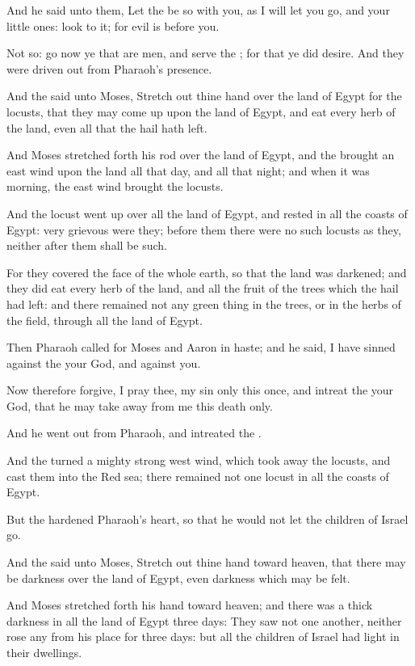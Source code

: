 \verse And he said unto them, Let the \LORD be so with you, as I will let you go, and your little ones: look to it; for evil is before you.

\verse Not so: go now ye that are men, and serve the \LORD; for that ye did desire. And they were driven out from Pharaoh's presence.

\verse And the \LORD said unto Moses, Stretch out thine hand over the land of Egypt for the locusts, that they may come up upon the land of Egypt, and eat every herb of the land, even all that the hail hath left.

\verse And Moses stretched forth his rod over the land of Egypt, and the \LORD brought an east wind upon the land all that day, and all that night; and when it was morning, the east wind brought the locusts.

\verse And the locust went up over all the land of Egypt, and rested in all the coasts of Egypt: very grievous were they; before them there were no such locusts as they, neither after them shall be such.

\verse For they covered the face of the whole earth, so that the land was darkened; and they did eat every herb of the land, and all the fruit of the trees which the hail had left: and there remained not any green thing in the trees, or in the herbs of the field, through all the land of Egypt.

\verse Then Pharaoh called for Moses and Aaron in haste; and he said, I have sinned against the \LORD your God, and against you.

\verse Now therefore forgive, I pray thee, my sin only this once, and intreat the \LORD your God, that he may take away from me this death only.

\verse And he went out from Pharaoh, and intreated the \LORD.

\verse And the \LORD turned a mighty strong west wind, which took away the locusts, and cast them into the Red sea; there remained not one locust in all the coasts of Egypt.

\verse But the \LORD hardened Pharaoh's heart, so that he would not let the children of Israel go.

\verse And the \LORD said unto Moses, Stretch out thine hand toward heaven, that there may be darkness over the land of Egypt, even darkness which may be felt.

\verse And Moses stretched forth his hand toward heaven; and there was a thick darkness in all the land of Egypt three days: \verse They saw not one another, neither rose any from his place for three days: but all the children of Israel had light in their dwellings.

